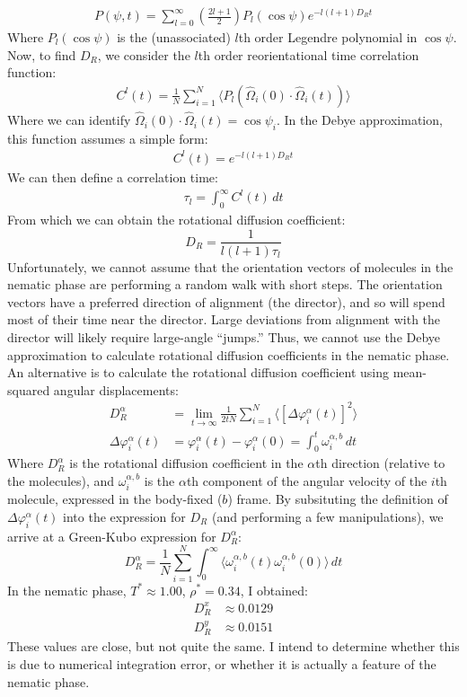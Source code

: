 \documentclass[12pt,a4paper]{article}
\begin{document}
\begin{align*}
P(\psi, t) = \sum_{l=0}^{\infty}\left( \frac{2l+1}{2}\right) P_l(\cos{\psi})e^{-l(l+1)D_Rt}
\end{align*}
Where $P_l(\cos{\psi})$ is the (unassociated) $l$th order Legendre polynomial in $\cos{\psi}$.\\
Now, to find $D_R$, we consider the $l$th order reorientational time correlation function:
\begin{align*}
C^l(t) =  \frac{1}{N}\sum_{i=1}^N\langle P_l(\hat{\Omega}_i(0)\cdot \hat{\Omega}_i(t))\rangle
\end{align*}
Where we can identify $\hat{\Omega}_i(0)\cdot \hat{\Omega}_i(t) =\cos{\psi_i}$. In the Debye approximation, this function assumes a simple form:
\begin{align*}
C^l(t) = e^{-l(l+1)D_Rt}
\end{align*}
We can then define a correlation time: 
\begin{align*}
\tau_l = \int_{0}^{\infty}C^l(t) \, dt
\end{align*}
From which we can obtain the rotational diffusion coefficient:
\[
D_R = \frac{1}{l(l+1)\tau_l}
\]
Unfortunately, we cannot assume that the orientation vectors of molecules in the nematic phase are performing a random walk with short steps. The orientation vectors have a preferred direction of alignment (the director), and so will spend most of their time near the director. Large deviations from alignment with the director will likely require large-angle ``jumps.'' Thus, we cannot use the Debye approximation to calculate rotational diffusion coefficients in the nematic phase. An alternative is to calculate the rotational diffusion coefficient using mean-squared angular displacements:
\begin{align*}
D_R^{\alpha} &= \lim_{t\to\infty}\frac{1}{2tN}\sum_{i=1}^N\langle[\Delta \varphi_i^{\alpha}(t)]^2\rangle\\
\Delta \varphi_i^{\alpha}(t) &= \varphi_i^{\alpha}(t) - \varphi_i^{\alpha}(0) = \int_0^t \omega_i^{\alpha, b} \, dt
\end{align*}
Where $D_R^{\alpha}$ is the rotational diffusion coefficient in the $\alpha$th direction (relative to the molecules), and $\omega_i^{\alpha, b}$ is the $\alpha$th component of the angular velocity of the $i$th molecule, expressed in the body-fixed ($b$) frame. By subsituting the definition of $\Delta \varphi_i^{\alpha}(t)$ into the expression for $D_R$ (and performing a few manipulations), we arrive at a Green-Kubo expression for $D_R^{\alpha}$:
\[
D_R^{\alpha} = \frac{1}{N}\sum_{i=1}^N\int_0^{\infty}\langle \omega_i^{\alpha, b}(t)\omega_i^{\alpha, b}(0)\rangle \, dt
\]
In the nematic phase, $T^*\approx 1.00$, $\rho^*=0.34$, I obtained:
\begin{align*}
D_R^x &\approx 0.0129\\
D_R^y &\approx 0.0151
\end{align*}
These values are close, but not quite the same. I intend to determine whether this is due to numerical integration error, or whether it is actually a feature of the nematic phase.
\end{document}
